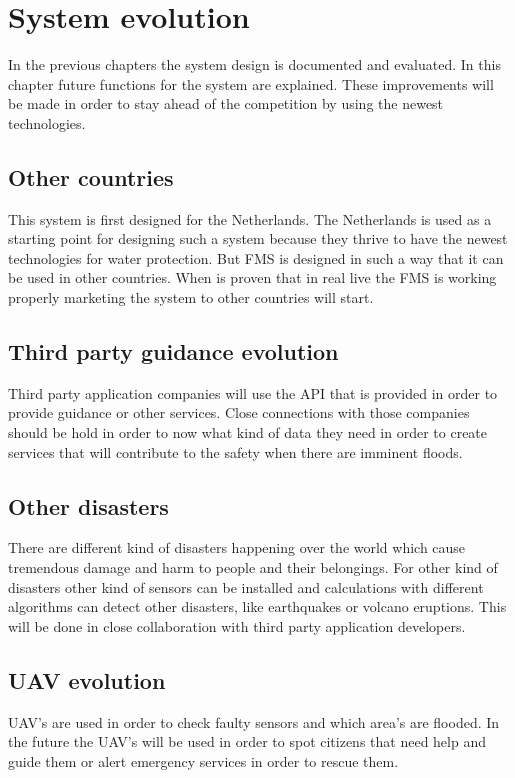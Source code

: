 \chapter{System evolution}

\label{ch:evolution}
In the previous chapters the system design is documented and evaluated. In this chapter future functions for the system are explained. These improvements will be made in order to stay ahead of the competition by using the newest technologies.

\section{Other countries}
This system is first designed for the Netherlands. The Netherlands is used as a starting point for designing such a system because they thrive to have the newest technologies for water protection. But FMS is designed in such a way that it can be used in other countries. When is proven that in real live the FMS is working properly marketing the system to other countries will start.

\section{Third party guidance evolution}
Third party application companies will use the API that is provided in order to provide guidance or other services. Close connections with those companies should be hold in order to now what kind of data they need in order to create services that will contribute to the safety when there are imminent floods. 

\section{Other disasters}
There are different kind of disasters happening over the world which cause tremendous damage and harm to people and their belongings. For other kind of disasters other kind of sensors can be installed and calculations with different algorithms can detect other disasters, like earthquakes or volcano eruptions. This will be done in close collaboration with third party application developers.

\section{UAV evolution}
UAV's are used in order to check faulty sensors and which area's are flooded. In the future the UAV's will be used in order to spot citizens that need help and guide them or alert emergency services in order to rescue them. 

